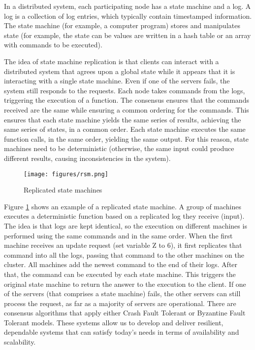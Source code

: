 \documentclass[12pt,a4paper]{article}
\begin{document}
In a distributed system, each participating node has a state machine and a log. A log is a collection of log entries, which typically contain timestamped information. The state machine (for example, a computer program) stores and manipulates state (for example, the state can be values are written in a hash table or an array with commands to be executed).

The idea of state machine replication is that clients can interact with a distributed system that agrees upon a global state while it appears that it is interacting with a single state machine. Even if one of the servers fails, the system still responds to the requests. Each node takes commands from the logs, triggering the execution of a function. The consensus ensures that the commands received are the same while ensuring a common ordering for the commands. This ensures that each state machine yields the same series of results, achieving the same series of states, in a common order. Each state machine executes the same function calls, in the same order, yielding the same output. For this reason, state machines need to be deterministic (otherwise, the same input could produce different results, causing inconsistencies in the system).

\begin{figure}[h!]
\centering
\texttt{[image: figures/rsm.png]}
\caption{Replicated state machines \cite{replicated}}
\label{fig:rms}
\end{figure}

Figure \ref{fig:rms} shows an example of a replicated state machine. A group of machines executes a deterministic function based on a replicated log they receive (input). The idea is that logs are kept identical, so the execution on different machines is performed using the same commands and in the same order. When the first machine receives an update request (set variable Z to 6), it first replicates that command into all the logs, passing that command to the other machines on the cluster. All machines add the newest command to the end of their logs. After that, the command can be executed by each state machine. This triggers the original state machine to return the answer to the execution to the client. If one of the servers (that comprises a state machine) fails, the other servers can still process the request, as far as a majority of servers are operational. There are consensus algorithms that apply either Crash Fault Tolerant or Byzantine Fault Tolerant models. These systems allow us to develop and deliver resilient, dependable systems that can satisfy today's needs in terms of availability and scalability.
\end{document}
